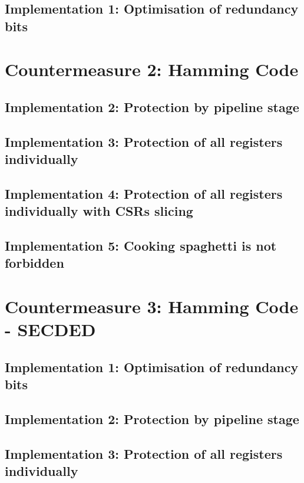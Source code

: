 \subsection{Implementation 1: Optimisation of redundancy bits}

\section{Countermeasure 2: Hamming Code}

\subsection{Implementation 2: Protection by pipeline stage}

\subsection{Implementation 3: Protection of all registers individually}

\subsection{Implementation 4: Protection of all registers individually with CSRs slicing}

\subsection{Implementation 5: Cooking spaghetti is not forbidden}

\section{Countermeasure 3: Hamming Code - SECDED}

\subsection{Implementation 1: Optimisation of redundancy bits}

\subsection{Implementation 2: Protection by pipeline stage}

\subsection{Implementation 3: Protection of all registers individually}

